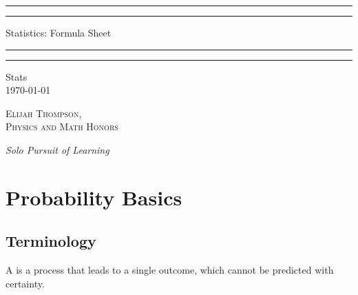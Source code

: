 \documentclass[12pt]{report}
\begin{document}


\begin{titlepage}
    \centering
    \scshape
    \vspace*{\baselineskip}
    \rule{\textwidth}{1.6pt}\vspace*{-\baselineskip}\vspace*{2pt}
    \rule{\textwidth}{0.4pt}
    
    \vspace{0.75\baselineskip}
    
    {\LARGE Statistics: Formula Sheet}
    
    \vspace{0.75\baselineskip}
    
    \rule{\textwidth}{0.4pt}\vspace*{-\baselineskip}\vspace{3.2pt}
    \rule{\textwidth}{1.6pt}
    
    \vspace{2\baselineskip}
    Stats \\
    \vspace*{3\baselineskip}
    \monthdayyeardate\today \\
    \vspace*{5.0\baselineskip}
    
    {\scshape\Large Elijah Thompson, \\ Physics and Math Honors\\}
    
    \vspace{1.0\baselineskip}
    \textit{Solo Pursuit of Learning}
\end{titlepage}

\tableofcontents



\chapter{Probability Basics}

\section{Terminology}

\begin{defn}{}{}
    A  is a process that leads to a single outcome, which cannot be predicted with certainty.
\end{defn}
\end{document}
